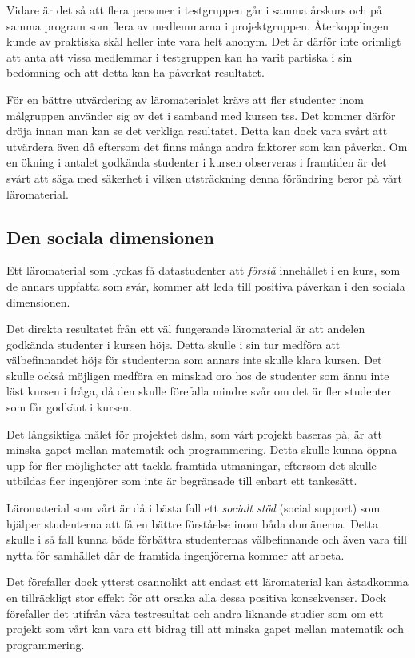 \documentclass[12pt,a4paper,twoside,openright]{article}
\begin{document}
Vidare är det så att flera personer i testgruppen går i samma årskurs
och på samma program som flera av medlemmarna i
projektgruppen. Återkopplingen kunde av praktiska skäl heller inte
vara helt anonym. Det är därför inte orimligt att anta att vissa
medlemmar i testgruppen kan ha varit partiska i sin bedömning och att
detta kan ha påverkat resultatet.

För en bättre utvärdering av läromaterialet krävs att fler studenter
inom målgruppen använder sig av det i samband med kursen
\gls{tss}. Det kommer därför dröja innan man kan se det verkliga
resultatet. Detta kan dock vara svårt att utvärdera även då eftersom
det finns många andra faktorer som kan påverka. Om en ökning i antalet
godkända studenter i kursen observeras i framtiden är det svårt att
säga med säkerhet i vilken utsträckning denna förändring beror på vårt
läromaterial.

\subsection{Den sociala dimensionen}

Ett läromaterial som lyckas få datastudenter att \emph{förstå}
innehållet i en kurs, som de annars uppfatta som svår, kommer att leda
till positiva påverkan i den sociala
dimensionen.

Det direkta resultatet från ett väl fungerande läromaterial är att
andelen godkända studenter i kursen höjs. Detta skulle i sin tur
medföra att välbefinnandet höjs för studenterna som annars inte skulle
klara kursen. Det skulle också möjligen medföra en minskad oro hos de
studenter som ännu inte läst kursen i fråga, då den skulle förefalla
mindre svår om det är fler studenter som får godkänt i kursen.

Det långsiktiga målet för projektet \gls{dslm}, som vårt projekt
baseras på, är att minska gapet mellan matematik och
programmering.
Detta skulle kunna öppna upp för fler möjligheter att tackla framtida
utmaningar, eftersom det skulle utbildas fler ingenjörer som inte är
begränsade till enbart ett tankesätt.

Läromaterial som vårt är då i bästa fall ett \emph{socialt stöd} (social support)
som hjälper studenterna att få en bättre förståelse inom båda
domänerna. Detta skulle i så fall kunna både förbättra studenternas
välbefinnande och även vara till nytta för samhället där de framtida
ingenjörerna kommer att arbeta.

Det förefaller dock ytterst osannolikt att endast ett läromaterial kan
åstadkomma en tillräckligt stor effekt för att orsaka alla dessa
positiva konsekvenser. Dock förefaller det utifrån våra testresultat
och andra liknande studier som om ett projekt som vårt kan vara ett
bidrag till att minska gapet mellan matematik och programmering.
\end{document}
